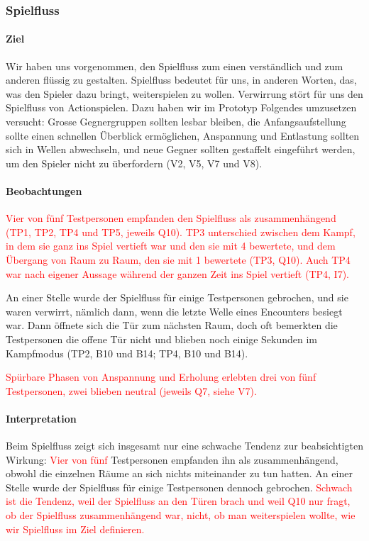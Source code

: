 \documentclass[../Main.tex]{subfiles}
\begin{document}
\subsubsection{Spielfluss}

\paragraph{Ziel}
Wir haben uns vorgenommen, den Spielfluss zum einen verständlich und zum anderen flüssig zu gestalten. Spielfluss bedeutet für uns, in anderen Worten, das, was den Spieler dazu bringt, weiterspielen zu wollen. Verwirrung stört für uns den Spielfluss von Actionspielen. Dazu haben wir im Prototyp Folgendes umzusetzen versucht: Grosse Gegnergruppen sollten lesbar bleiben, die Anfangsaufstellung sollte einen schnellen Überblick ermöglichen, Anspannung und Entlastung sollten sich in Wellen abwechseln, und neue Gegner sollten gestaffelt eingeführt werden, um den Spieler nicht zu überfordern (V2, V5, V7 und V8).

\paragraph{Beobachtungen}
\textcolor{red}{Vier von fünf Testpersonen empfanden den Spielfluss als zusammenhängend (TP1, TP2, TP4 und TP5, jeweils Q10). TP3 unterschied zwischen dem Kampf, in dem sie ganz ins Spiel vertieft war und den sie mit 4 bewertete, und dem Übergang von Raum zu Raum, den sie mit 1 bewertete (TP3, Q10). Auch TP4 war nach eigener Aussage während der ganzen Zeit ins Spiel vertieft (TP4, I7).}

An einer Stelle wurde der Spielfluss für einige Testpersonen gebrochen, und sie waren verwirrt, nämlich dann, wenn die letzte Welle eines Encounters besiegt war. Dann öffnete sich die Tür zum nächsten Raum, doch oft bemerkten die Testpersonen die offene Tür nicht und blieben noch einige Sekunden im Kampfmodus (TP2, B10 und B14; TP4, B10 und B14).

\textcolor{red}{Spürbare Phasen von Anspannung und Erholung erlebten drei von fünf Testpersonen, zwei blieben neutral (jeweils Q7, siehe V7).}

\paragraph{Interpretation}
Beim Spielfluss zeigt sich insgesamt nur eine schwache Tendenz zur beabsichtigten Wirkung: \textcolor{red}{Vier von fünf} Testpersonen empfanden ihn als zusammenhängend, obwohl die einzelnen Räume an sich nichts miteinander zu tun hatten. An einer Stelle wurde der Spielfluss für einige Testpersonen dennoch gebrochen. \textcolor{red}{Schwach ist die Tendenz, weil der Spielfluss an den Türen brach und weil Q10 nur fragt, ob der Spielfluss zusammenhängend war, nicht, ob man weiterspielen wollte, wie wir Spielfluss im Ziel definieren.}
\end{document}
